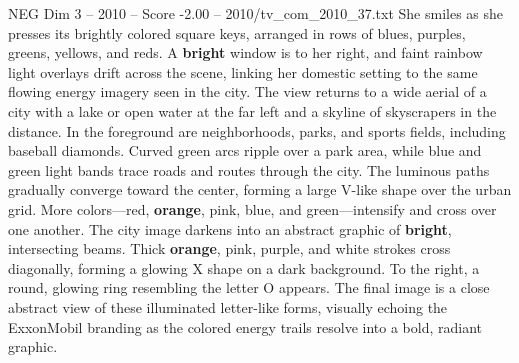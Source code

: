 \begin{textsample}{NEG Dim 3 – 2010 – Score -2.00 – 2010/tv\_com\_2010\_37.txt}
She smiles as she presses its brightly colored square keys, arranged in rows of blues, purples, greens, yellows, and reds.
A \textbf{bright} window is to her right, and faint rainbow light overlays drift across the scene, linking her domestic setting to the same flowing energy imagery seen in the city.
The view returns to a wide aerial of a city with a lake or open water at the far left and a skyline of skyscrapers in the distance.
In the foreground are neighborhoods, parks, and sports fields, including baseball diamonds.
Curved green arcs ripple over a park area, while blue and green light bands trace roads and routes through the city.
The luminous paths gradually converge toward the center, forming a large V-like shape over the urban grid.
More colors—red, \textbf{orange}, pink, blue, and green—intensify and cross over one another.
The city image darkens into an abstract graphic of \textbf{bright}, intersecting beams.
Thick \textbf{orange}, pink, purple, and white strokes cross diagonally, forming a glowing X shape on a dark background.
To the right, a round, glowing ring resembling the letter O appears.
The final image is a close abstract view of these illuminated letter-like forms, visually echoing the ExxonMobil branding as the colored energy trails resolve into a bold, radiant graphic.

\end{textsample}
